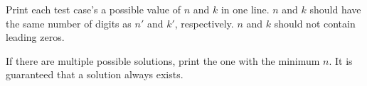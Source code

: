 Print each test case's a possible value of $n$ and $k$ in one line.
$n$ and $k$ should have the same number of digits as $n'$ and $k'$, respectively.
$n$ and $k$ should not contain leading zeros.

If there are multiple possible solutions, print the one with the minimum $n$.
It is guaranteed that a solution always exists.
